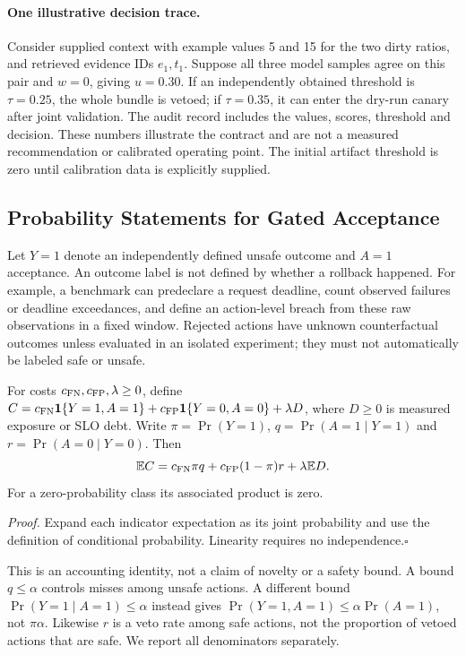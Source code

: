 \paragraph{One illustrative decision trace.}
Consider supplied context with example values 5 and 15 for the two dirty ratios, and retrieved evidence IDs $e_1,t_1$. Suppose all three model samples agree on this pair and $w=0$, giving $u=0.30$. If an independently obtained threshold is $\tau=0.25$, the whole bundle is vetoed; if $\tau=0.35$, it can enter the dry-run canary after joint validation. The audit record includes the values, scores, threshold and decision. These numbers illustrate the contract and are not a measured recommendation or calibrated operating point. The initial artifact threshold is zero until calibration data is explicitly supplied.

\subsection{Probability Statements for Gated Acceptance}
\label{subsec:theorem}
Let $Y=1$ denote an independently defined unsafe outcome and $A=1$ acceptance. An outcome label is not defined by whether a rollback happened. For example, a benchmark can predeclare a request deadline, count observed failures or deadline exceedances, and define an action-level breach from these raw observations in a fixed window. Rejected actions have unknown counterfactual outcomes unless evaluated in an isolated experiment; they must not automatically be labeled safe or unsafe.

\begin{theorem}\label{thm:pac-cost}
For costs $c_{\rm FN},c_{\rm FP},\lambda\ge0$, define
$C=c_{\rm FN}\mathbf{1}\{Y=1,A=1\}+c_{\rm FP}\mathbf{1}\{Y=0,A=0\}+\lambda D$,
where $D\ge0$ is measured exposure or SLO debt. Write $\pi=\Pr(Y=1)$,
$q=\Pr(A=1\mid Y=1)$ and $r=\Pr(A=0\mid Y=0)$. Then
\[
\mathbb{E}C=c_{\rm FN}\pi q+c_{\rm FP}(1-\pi)r+\lambda\mathbb{E}D.
\]
For a zero-probability class its associated product is zero.
\end{theorem}
\noindent\emph{Proof.} Expand each indicator expectation as its joint probability and use the definition of conditional probability. Linearity requires no independence.\hfill$\square$

This is an accounting identity, not a claim of novelty or a safety bound. A bound $q\le\alpha$ controls misses among unsafe actions. A different bound $\Pr(Y=1\mid A=1)\le\alpha$ instead gives
$\Pr(Y=1,A=1)\le\alpha\Pr(A=1)$, not $\pi\alpha$. Likewise $r$ is a veto rate among safe actions, not the proportion of vetoed actions that are safe. We report all denominators separately.

